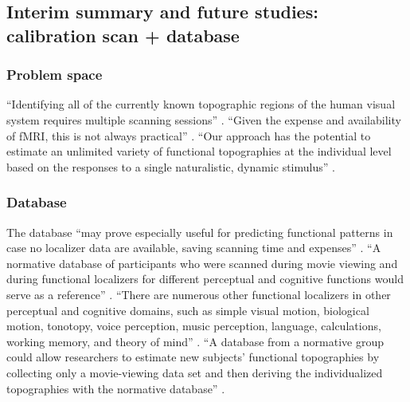 \subsection{Interim summary and future studies: calibration scan + database}






\subsubsection{Problem space}

``Identifying all of the currently known topographic regions of the human visual
system requires multiple scanning sessions'' \citep{wang2015probabilistic}.
%
``Given the expense and availability of fMRI, this is not always practical''
\citep{wang2015probabilistic}.
%
``Our approach has the potential to estimate an unlimited variety of functional
topographies at the individual level based on the responses to a single
naturalistic, dynamic stimulus'' \citep{jiahui2020predicting}.



\subsubsection{Database}
%
The database ``may prove especially useful for predicting functional patterns in
case no localizer data are available, saving scanning time and expenses''
\citep{rosenke2021probabilistic}.
%
``A normative database of participants who were scanned during movie viewing and
during functional localizers for different perceptual and cognitive functions
would serve as a reference'' \citep{jiahui2020predicting}.
%
``There are numerous other functional localizers in other perceptual and
cognitive domains, such as simple visual motion, biological motion, tonotopy,
voice perception, music perception, language, calculations, working memory, and
theory of mind'' \citep{jiahui2020predicting}.
%
``A database from a normative group could allow researchers to estimate new
subjects' functional topographies by collecting only a movie-viewing data set
and then deriving the individualized topographies with the normative database''
\citep{jiahui2020predicting}.



